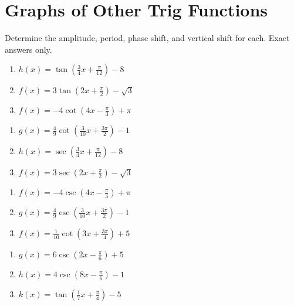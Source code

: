 \chapter{Graphs of Other Trig Functions}

Determine the amplitude, period, phase shift, and vertical shift for each. Exact answers only.

\begin{multicols}{3}
\begin{enumerate}
	\item $h(x) = \tan\left(\frac{3}{4}x + \frac{\pi}{12}\right) - 8$
	\item $f(x)=3\tan\left(2x+\frac{\pi}{2}\right)-\sqrt{3}$
	\item $f(x) = -4\cot\left(4x-\frac{\pi}{3}\right) + \pi$
\end{enumerate}	\setcounter{Review}{\value{enumi}}
\end{multicols}
\smallskip 
\begin{multicols}{3}
\begin{enumerate}	\setcounter{enumi}{\value{Review}}
	\item $g(x) = \frac{4}{9}\cot\left(\frac{3}{10}x + \frac{3\pi}{2}\right) - 1$
	\item $h(x) = \sec\left(\frac{3}{4}x + \frac{\pi}{12}\right) - 8$
	\item $f(x)=3\sec\left(2x+\frac{\pi}{2}\right)-\sqrt{3}$
\end{enumerate}	\setcounter{Review}{\value{enumi}}
\end{multicols}
\smallskip 
\begin{multicols}{3}
\begin{enumerate}	\setcounter{enumi}{\value{Review}}
	\item $f(x) = -4\csc\left(4x-\frac{\pi}{3}\right) + \pi$
	\item $g(x) = \frac{4}{9}\csc\left(\frac{3}{10}x + \frac{3\pi}{2}\right) - 1$
	\item $f(x) = \frac{1}{10}\cot\left(3x+\frac{3\pi}{4}\right) + 5$
\end{enumerate}	\setcounter{Review}{\value{enumi}}
\end{multicols}
\smallskip
\begin{multicols}{3}
\begin{enumerate}	\setcounter{enumi}{\value{Review}}
	\item $g(x) = 6\csc\left(2x-\frac{\pi}{6}\right)+5$
	\item $h(x) = 4\csc\left(8x-\frac{\pi}{6}\right)-1$
	\item $k(x) = \tan\left(\frac{1}{7}x+\frac{\pi}{4}\right)-5$
\end{enumerate}	\setcounter{Review}{\value{enumi}}
\end{multicols}
